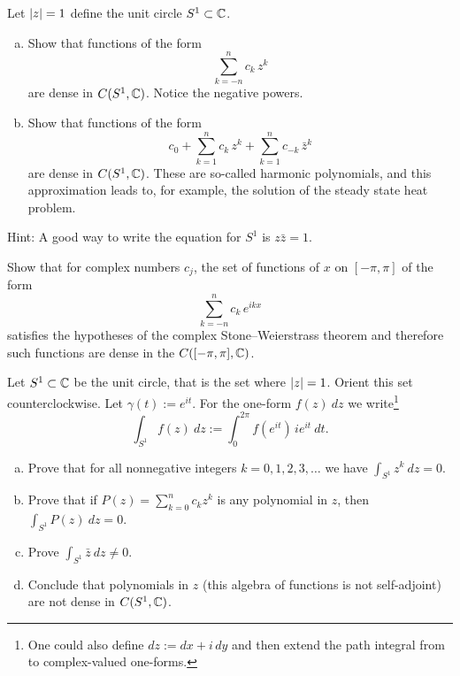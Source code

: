 \pagebreak[2]
\begin{exercise}
Let $\lvert {z} \rvert=1$ define the unit circle $S^1 \subset {\mathbb{C}}$.
\begin{enumerate}[a)]
\item
Show that functions of the form
\begin{equation*}
\sum_{k=-n}^n c_k\, z^k
\end{equation*}
are dense in $C(S^1,{\mathbb{C}})$.  Notice the negative powers.
\item 
Show that functions of the form
\begin{equation*}
c_0
+
\sum_{k=1}^n c_k \, z^k
+
\sum_{k=1}^n c_{-k}\, \bar{z}^k
\end{equation*}
are dense in $C(S^1,{\mathbb{C}})$.  These are so-called harmonic polynomials,
and this approximation leads to, for example, the solution of the
steady state heat problem.
\end{enumerate}
Hint: A good way to write the equation for $S^1$ is $z \bar{z} = 1$.
\end{exercise}

\pagebreak[1]
\begin{exercise}
Show that for complex numbers $c_j$, the set of functions
of $x$ on $[-\pi,\pi]$
of the form
\begin{equation*}
\sum_{k=-n}^n c_k \, e^{ik x}
\end{equation*}
satisfies the hypotheses of the complex Stone--Weierstrass theorem
and therefore such functions are dense in the $C([-\pi,\pi],{\mathbb{C}})$.
\end{exercise}


\begin{exercise} \label{exercise:selfadjointSW}
Let $S^1 \subset {\mathbb{C}}$ be the unit circle, that is the set where
$\lvert {z} \rvert = 1$.  Orient this set counterclockwise.
Let $\gamma(t) := e^{it}$.
For the one-form $f(z)~dz$ we write\footnote{%
One could also define $dz := dx + i \, dy$ and then
extend the path integral from  to complex-valued
one-forms.}
\begin{equation*}
\int_{S^1} f(z) ~dz := \int_0^{2\pi} f(e^{it}) \, i e^{it} ~ dt . 
\end{equation*}
\begin{enumerate}[a)]
\item
Prove that for all nonnegative integers $k = 0,1,2,3,\ldots$ we have
$\int_{S^1} z^k ~ dz = 0$.
\item
Prove that if
$P(z) = \sum_{k=0}^n c_k z^k$ is any
polynomial in $z$, then
$\int_{S^1} P(z) ~ dz = 0$.
\item
Prove
$\int_{S^1} \bar{z} ~ dz \not= 0$.
\item
Conclude that polynomials in $z$ (this algebra of functions is
not self-adjoint) are not dense in $C(S^1,{\mathbb{C}})$.
\end{enumerate}
\end{exercise}

